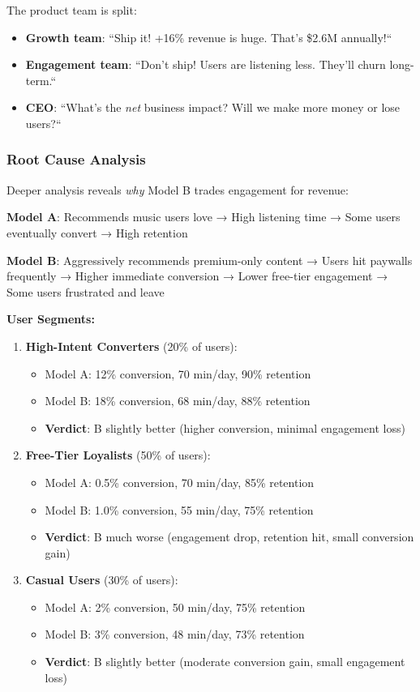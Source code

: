 The product team is split:
\begin{itemize}
    \item \textbf{Growth team}: ``Ship it! +16\% revenue is huge. That's \$2.6M annually!``
    \item \textbf{Engagement team}: ``Don't ship! Users are listening less. They'll churn long-term.``
    \item \textbf{CEO}: ``What's the \textit{net} business impact? Will we make more money or lose users?``
\end{itemize}

\subsubsection{Root Cause Analysis}

Deeper analysis reveals \textit{why} Model B trades engagement for revenue:

\textbf{Model A}: Recommends music users love → High listening time → Some users eventually convert → High retention

\textbf{Model B}: Aggressively recommends premium-only content → Users hit paywalls frequently → Higher immediate conversion → Lower free-tier engagement → Some users frustrated and leave

\textbf{User Segments:}
\begin{enumerate}
    \item \textbf{High-Intent Converters} (20\% of users):
    \begin{itemize}
        \item Model A: 12\% conversion, 70 min/day, 90\% retention
        \item Model B: 18\% conversion, 68 min/day, 88\% retention
        \item \textbf{Verdict}: B slightly better (higher conversion, minimal engagement loss)
    \end{itemize}

    \item \textbf{Free-Tier Loyalists} (50\% of users):
    \begin{itemize}
        \item Model A: 0.5\% conversion, 70 min/day, 85\% retention
        \item Model B: 1.0\% conversion, 55 min/day, 75\% retention
        \item \textbf{Verdict}: B much worse (engagement drop, retention hit, small conversion gain)
    \end{itemize}

    \item \textbf{Casual Users} (30\% of users):
    \begin{itemize}
        \item Model A: 2\% conversion, 50 min/day, 75\% retention
        \item Model B: 3\% conversion, 48 min/day, 73\% retention
        \item \textbf{Verdict}: B slightly better (moderate conversion gain, small engagement loss)
    \end{itemize}
\end{enumerate}

